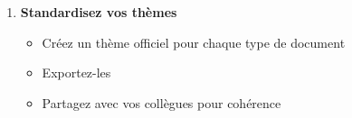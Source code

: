 \begin{enumerate}[leftmargin=*]
    \item \textbf{Standardisez vos thèmes}
    \begin{itemize}
        \item Créez un thème officiel pour chaque type de document
        \item Exportez-les
        \item Partagez avec vos collègues pour cohérence
    \end{itemize}
\end{enumerate}

\newpage
